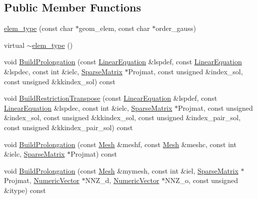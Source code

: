 \subsection*{Public Member Functions}
\begin{DoxyCompactItemize}
\item 
\mbox{\hyperlink{classfemus_1_1elem__type_aa2d116602d97b226a4a01578dd45bb20}{elem\+\_\+type}} (const char $\ast$geom\+\_\+elem, const char $\ast$order\+\_\+gauss)
\item 
virtual \mbox{\hyperlink{classfemus_1_1elem__type_a3e13560174d1ea0282665fbbf4eb605d}{$\sim$elem\+\_\+type}} ()
\item 
void \mbox{\hyperlink{classfemus_1_1elem__type_aaa5317cf0e1944adeaca3b5f1d0c3610}{Build\+Prolongation}} (const \mbox{\hyperlink{classfemus_1_1_linear_equation}{Linear\+Equation}} \&lspdef, const \mbox{\hyperlink{classfemus_1_1_linear_equation}{Linear\+Equation}} \&lspdec, const int \&ielc, \mbox{\hyperlink{classfemus_1_1_sparse_matrix}{Sparse\+Matrix}} $\ast$Projmat, const unsigned \&index\+\_\+sol, const unsigned \&kkindex\+\_\+sol) const
\item 
void \mbox{\hyperlink{classfemus_1_1elem__type_a204517efabff34e2692a77f4b8bd44e9}{Build\+Restriction\+Transpose}} (const \mbox{\hyperlink{classfemus_1_1_linear_equation}{Linear\+Equation}} \&lspdef, const \mbox{\hyperlink{classfemus_1_1_linear_equation}{Linear\+Equation}} \&lspdec, const int \&ielc, \mbox{\hyperlink{classfemus_1_1_sparse_matrix}{Sparse\+Matrix}} $\ast$Projmat, const unsigned \&index\+\_\+sol, const unsigned \&kkindex\+\_\+sol, const unsigned \&index\+\_\+pair\+\_\+sol, const unsigned \&kkindex\+\_\+pair\+\_\+sol) const
\item 
void \mbox{\hyperlink{classfemus_1_1elem__type_ab877a3438c82ef2b4f096f38c3811b7f}{Build\+Prolongation}} (const \mbox{\hyperlink{classfemus_1_1_mesh}{Mesh}} \&meshf, const \mbox{\hyperlink{classfemus_1_1_mesh}{Mesh}} \&meshc, const int \&ielc, \mbox{\hyperlink{classfemus_1_1_sparse_matrix}{Sparse\+Matrix}} $\ast$Projmat) const
\item 
void \mbox{\hyperlink{classfemus_1_1elem__type_acb499269b353c8b3e0ebb5e21254b108}{Build\+Prolongation}} (const \mbox{\hyperlink{classfemus_1_1_mesh}{Mesh}} \&mymesh, const int \&iel, \mbox{\hyperlink{classfemus_1_1_sparse_matrix}{Sparse\+Matrix}} $\ast$Projmat, \mbox{\hyperlink{classfemus_1_1_numeric_vector}{Numeric\+Vector}} $\ast$N\+N\+Z\+\_\+d, \mbox{\hyperlink{classfemus_1_1_numeric_vector}{Numeric\+Vector}} $\ast$N\+N\+Z\+\_\+o, const unsigned \&itype) const

\end{DoxyCompactItemize}
